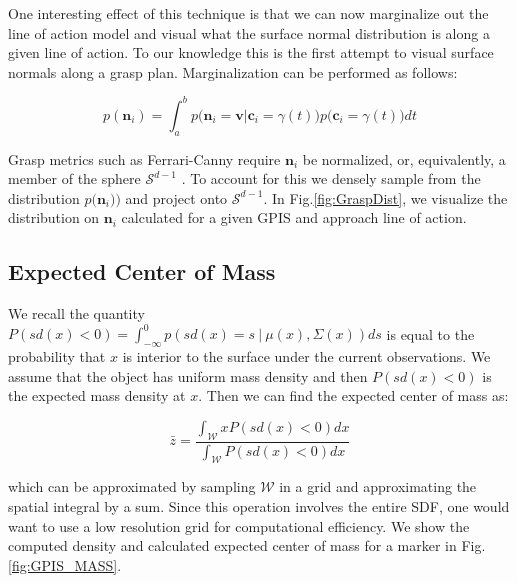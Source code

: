 \documentclass[letterpaper, 10 pt, conference]{ieeeconf}  %
\begin{document}
One interesting effect of this technique is that we can now marginalize out the line of action model and visual what the surface normal distribution is along a given line of action. To our knowledge this is the first attempt to visual surface normals along a grasp plan. Marginalization can be performed as follows:

\vspace{-2ex}
\begin{equation}
    p(\textbf{n}_i ) = \int_a^b   p\big(\textbf{n}_i = \textbf{v} | \textbf{c}_i = \gamma(t) \big)p\big(\textbf{c}_i = \gamma(t)\big) dt \label{eq:normal_dist}
\end{equation}

Grasp metrics such as  Ferrari-Canny require $\textbf{n}_i$ be normalized, or, equivalently, a member of the sphere $\mathcal{S}^{d-1}$ \cite{ferrari1992}. To account for this we densely sample from the  distribution $p \big(\textbf{n}_i ) \big)$  and project onto $\mathcal{S}^{d-1}$.  In Fig.\ref{fig:GraspDist}, we visualize the distribution on $\textbf{n}_i$ calculated for a given GPIS and approach line of action.


\subsection{Expected Center of Mass}\label{sec:mass} 

We recall the quantity $P(sd(x) < 0) = \int_{-\infty}^{0} p(sd(x) =  s \ | \ \mu(x),\Sigma(x)) ds$ is equal to the probability that $x$ is interior to the surface under the current observations.
We assume that the object has uniform mass density and then $P(sd(x) < 0)$ is the expected mass density at $x$.
Then we can find the expected center of mass as:

\label{eq:mass}
\begin{equation}
  \bar{z} 
  =
  \frac
    {\int_{\mathcal{W}}x P(sd(x)<0) dx}
    {\int_{\mathcal{W}}  P(sd(x)<0) dx}
\end{equation}

which can be approximated by sampling $\mathcal{W}$ in a grid and approximating the spatial integral by a sum. Since this operation involves the entire SDF, one would want to use a low resolution grid for computational efficiency. We show the computed density and calculated expected center of mass for a marker in Fig. \ref{fig:GPIS_MASS}.
\end{document}
